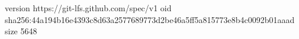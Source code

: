 version https://git-lfs.github.com/spec/v1
oid sha256:44a194b16e4393c8d63a2577689773d2be46a5ff5a815773e8b4c0092b01aaad
size 5648
